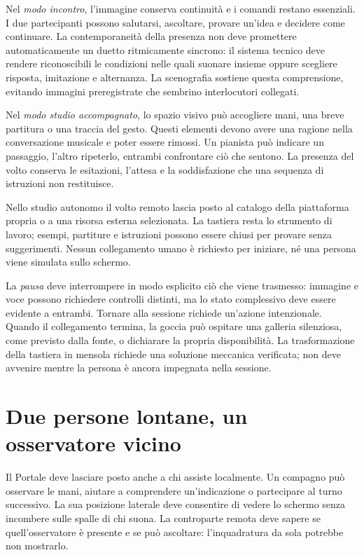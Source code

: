 Nel \emph{modo incontro}, l'immagine conserva continuità e i comandi
restano essenziali. I due partecipanti possono salutarsi, ascoltare,
provare un'idea e decidere come continuare. La contemporaneità della
presenza non deve promettere automaticamente un duetto ritmicamente
sincrono: il sistema tecnico deve rendere riconoscibili le condizioni
nelle quali suonare insieme oppure scegliere risposta, imitazione e
alternanza. La scenografia sostiene questa comprensione, evitando
immagini preregistrate che sembrino interlocutori collegati.

Nel \emph{modo studio accompagnato}, lo spazio visivo può accogliere mani, una breve
partitura o una traccia del gesto. Questi elementi devono avere una
ragione nella conversazione musicale e poter essere rimossi. Un pianista
può indicare un passaggio, l'altro ripeterlo, entrambi confrontare ciò
che sentono. La presenza del volto conserva le esitazioni, l'attesa e
la soddisfazione che una sequenza di istruzioni non restituisce.

Nello studio autonomo il volto remoto lascia posto al catalogo della
piattaforma propria o a una risorsa esterna selezionata. La tastiera
resta lo strumento di lavoro; esempi, partiture e istruzioni possono
essere chiusi per provare senza suggerimenti. Nessun collegamento umano
è richiesto per iniziare, né una persona viene simulata sullo schermo.

La \emph{pausa} deve interrompere in modo esplicito ciò che viene
trasmesso: immagine e voce possono richiedere controlli distinti, ma lo
stato complessivo deve essere evidente a entrambi. Tornare alla sessione
richiede un'azione intenzionale. Quando il collegamento termina, la
goccia può ospitare una galleria silenziosa, come previsto dalla fonte,
o dichiarare la propria disponibilità. La trasformazione della tastiera
in mensola richiede una soluzione meccanica verificata; non deve avvenire
mentre la persona è ancora impegnata nella sessione.

\section{Due persone lontane, un osservatore vicino}

Il Portale deve lasciare posto anche a chi assiste localmente. Un compagno
può osservare le mani, aiutare a comprendere un'indicazione o partecipare
al turno successivo. La sua posizione laterale deve consentire di vedere
lo schermo senza incombere sulle spalle di chi suona. La controparte
remota deve sapere se quell'osservatore è presente e se può ascoltare:
l'inquadratura da sola potrebbe non mostrarlo.


